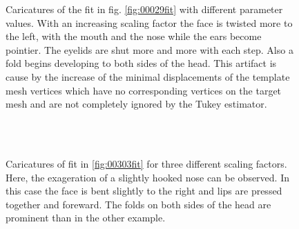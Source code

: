 \begin{figure}[h!]
    \caption{Caricatures of the fit in fig. \ref{fig:00029fit} with different parameter values. With an increasing scaling factor the face is twisted more to the left, with the mouth and the nose while the ears become pointier. The eyelids are shut more and more with each step. Also a fold begins developing to both sides of the head. This artifact is cause by the increase of the minimal displacements of the template mesh vertices which have no corresponding vertices on the target
mesh and are not completely ignored by the Tukey estimator.}
\label{fig:00029_caricature}
\end{figure}

\begin{figure}[h!]
    \centering
    \\
    \\
    \caption{Caricatures of fit in \ref{fig:00303fit} for three different scaling factors. Here, the exageration of a slightly hooked nose can be observed. In this case the face is bent slightly to the right and lips are pressed together and foreward. The folds on both sides of the head are prominent than in the other example.} 
\label{fig:00303_caricature}
\end{figure}

